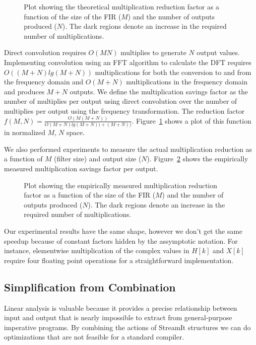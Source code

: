 \begin{figure}
\center
\epsfxsize=3.2in
\caption{Plot showing the theoretical multiplication reduction factor as a function of the size of the FIR ($M$) and the number of outputs produced ($N$). The dark regions denote an increase in the required number of multiplications.}
\label{fig:frequency-win-theory}
\vspace{-12pt}
\end{figure}

Direct convolution requires $O(MN)$ multiplies to generate $N$ output values. 
Implementing convolution using an FFT algorithm to calculate the DFT requires 
$O((M+N)lg(M+N))$ multiplications for both the conversion to and from the frequency domain
and $O(M+N)$ multiplications in the frequency domain and produces $M+N$ outputs.
We define the multiplication savings factor as the number of multiplies per output
using direct convolution over the number of multiplies per output using the 
frequency transformation. The reduction factor 
$f(M,N)=\frac{O(M(M+N))}{O(M+N)lg(M+N))+(M+N))}$.
Figure~\ref{fig:frequency-win-theory} shows a plot of this function in normalized 
$M$, $N$ space.

We also performed experiments to measure the actual multiplication reduction
as a function of $M$ (filter size) and output size ($N$).
Figure~\ref{fig:frequency-win-empirical} shows the empirically measured
multiplication savings factor per output.

\begin{figure}
\center
\epsfxsize=3.2in
\caption{Plot showing the empirically measured multiplication reduction factor as a function of the size of the FIR ($M$) and the number of outputs produced ($N$). The dark regions denote an increase in the required number of multiplications.}
\label{fig:frequency-win-empirical}
\vspace{-12pt}
\end{figure}

Our experimental results have the same shape, however we don't get the same
speedup because of constant factors hidden by the assymptotic notation. For instance,
elementwise multiplication of the complex values in $H[k]$ and $X[k]$ require
four floating point operations for a straightforward implementation.

\subsection{Simplification from Combination}
Linear analysis is valuable because it provides a precise relationship
between input and output that is nearly impossible to extract from
general-purpose imperative programs. By combining the actions of
StreamIt structures we can do optimizations that are not feasible for
a standard compiler.

